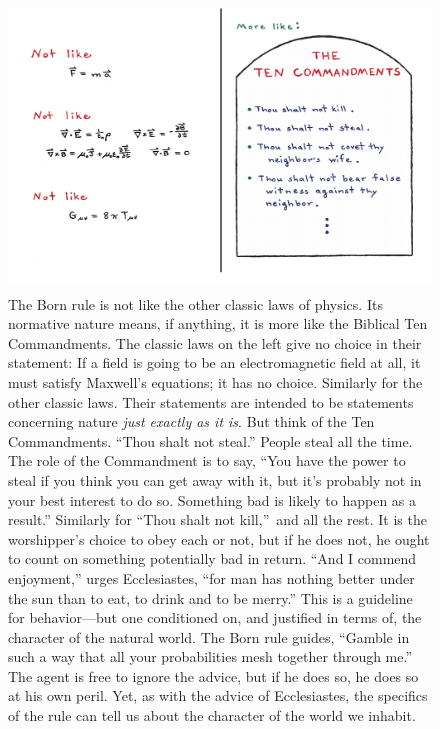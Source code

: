 \documentclass[aps,pra,superscriptaddress,10pt,tightenlines,twocolumn,nofootinbib]{revtex4}
\begin{document}
\begin{figure}
\begin{center}
\includegraphics[height=3in]{normativelawsupdate2}
\caption{ The Born rule is not like the other classic laws of physics.  Its normative nature means, if anything, it is more like the Biblical Ten Commandments.  The classic laws on the left give no choice in their statement: If a field is going to be an electromagnetic field at all, it must satisfy Maxwell's equations; it has no choice.  Similarly for the other classic laws.  Their statements are intended to be statements concerning nature {\it just exactly as it is}.  But think of the Ten Commandments.  ``Thou shalt not steal.''  People steal all the time.  The role of the Commandment is to say, ``You have the power to steal if you think you can get away with it, but it's probably not in your best interest to do so.  Something bad is likely to happen as a result.''  Similarly for ``Thou shalt not kill,''\ and all the rest.  It is the worshipper's choice to obey each or not, but if he does not, he ought to count on something potentially bad in return.  ``And I commend enjoyment,'' urges Ecclesiastes, ``for man has nothing better under the sun than to eat, to drink and to be merry.''  This is a guideline for behavior---but one conditioned on, and justified in terms of, the character of the natural world.  The Born rule guides, ``Gamble in such a way that all your probabilities mesh together through me.''  The agent is free to ignore the advice, but if he does so, he does so at his own peril.  Yet, as with the advice of Ecclesiastes, the specifics of the rule can tell us about the character of the world we inhabit.}
\end{center}
\end{figure}
\end{document}
